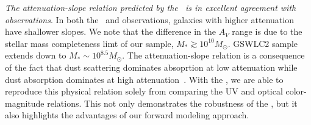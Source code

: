 \emph{The attenuation-slope relation predicted by the \eda~is in excellent 
agreement with observations}. In both the \eda~and observations, galaxies with 
higher attenuation have shallower slopes. We note that the difference in the
$A_V$ range is due to the stellar mass completeness limt of our sample, $M_* \gtrsim 
10^{10} M_\odot$. \cite{salim2020} GSWLC2 sample extends down to $M_* \sim 10^{8.5}M_\odot$. 
The attenuation-slope relation is a consequence of the fact that dust scattering 
dominates absoprtion at low attenuation while dust absorption dominates at high 
attenuation~\citep{gordon1994, witt2000, draine2003, chevallard2013}. With the
\eda, we are able to reproduce this physical relation solely from comparing the
UV and optical color-magnitude relations. This not only demonstrates the
robustness of the \eda, but it also highlights the advantages of 
our forward modeling approach. 

